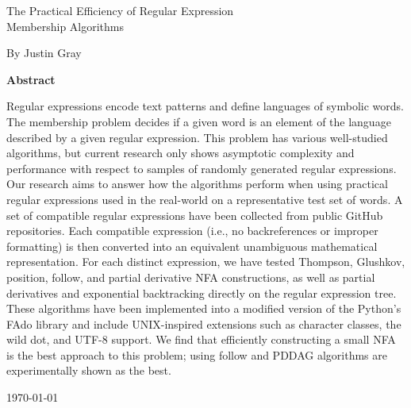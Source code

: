 \begin{center}
  {\Large The Practical Efficiency of Regular Expression\\
  Membership Algorithms}
  
  By Justin Gray
  
  \vspace{1cm}
  
  {\bf Abstract}\\
\end{center}

\begin{onehalfspace}
  Regular expressions encode text patterns and define languages of symbolic words. The membership problem decides if a given word is an element of the language described by a given regular expression. This problem has various well-studied algorithms, but current research only shows asymptotic complexity and performance with respect to samples of randomly generated regular expressions. Our research aims to answer how the algorithms perform when using practical regular expressions used in the real-world on a representative test set of words. A set of compatible regular expressions have been collected from public GitHub repositories. Each compatible expression (i.e., no backreferences or improper formatting) is then converted into an equivalent unambiguous mathematical representation. For each distinct expression, we have tested Thompson, Glushkov, position, follow, and partial derivative NFA constructions, as well as partial derivatives and exponential backtracking directly on the regular expression tree. These algorithms have been implemented into a modified version of the Python’s FAdo library and include UNIX-inspired extensions such as character classes, the wild dot, and UTF-8 support. We find that efficiently constructing a small NFA is the best approach to this problem; using follow and PDDAG algorithms are experimentally shown as the best.
\end{onehalfspace}
  
\vfill
  
{\flushright \today \\}